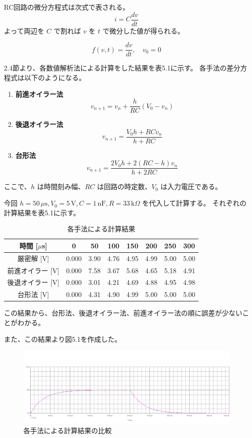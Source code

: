 \documentclass{jlreq}
\numberwithin{equation}{section}
\begin{document}
RC回路の微分方程式は次式で表される。
\[
i = C \frac{dv}{dt}
\]
よって両辺を \( C \) で割れば \( v \) を \( t \) で微分した値が得られる。

\[
f(v, t) = \frac{dv}{dt},\quad v_0 = 0
\]

2.4節より、各数値解析法による計算をした結果を表5.1に示す。
各手法の差分方程式は以下のようになる。

\begin{enumerate}
  \item \textbf{前進オイラー法}
  \[
    v_{n+1} = v_n + \frac{h}{RC}(V_0 - v_n)
  \]
  \item \textbf{後退オイラー法}
  \[
    v_{n+1} = \frac{V_0 h + RC v_n}{h + RC}
  \]
  \item \textbf{台形法}
  \[
    v_{n+1} = \frac{2 V_0 h + 2 (RC - h) v_n}{h + 2RC}
  \]
\end{enumerate}

ここで、\( h \) は時間刻み幅、\( RC \) は回路の時定数、\( V_0 \) は入力電圧である。

今回 \( h = 50 \, \mu\mathrm{s}, V_0 = 5 \, \mathrm{V}, C = 1 \, \mathrm{nF}, R = 33 \, \mathrm{k}\Omega \) を代入して計算する。
それぞれの計算結果を表5.1に示す。

\begin{table}[H]
  \centering
  \caption{各手法による計算結果}
  \begin{tabular}{|c|c|c|c|c|c|c|c|}
    \hline
    時間 [\(\mu\)s] & 0 & 50 & 100 & 150 & 200 & 250 & 300 \\ \hline
    厳密解 [V] & 0.000 & 3.90 & 4.76 & 4.95 & 4.99 & 5.00 & 5.00 \\ \hline
    前進オイラー [V] & 0.000 & 7.58 & 3.67 & 5.68 & 4.65 & 5.18 & 4.91 \\ \hline
    後退オイラー [V] & 0.000 & 3.01 & 4.21 & 4.69 & 4.88 & 4.95 & 4.98 \\ \hline
    台形法 [V] & 0.000 & 4.31 & 4.90 & 4.99 & 5.00 & 5.00 & 5.00 \\ \hline
  \end{tabular}
\end{table}

この結果から、台形法、後退オイラー法、前進オイラー法の順に誤差が少ないことがわかる。

また、この結果より図5.1を作成した。

\begin{figure}[H]
  \centering
  \includegraphics[width=\textwidth]{assets/katohikakuplot.png}
  \caption{各手法による計算結果の比較}
\end{figure}
\end{document}
